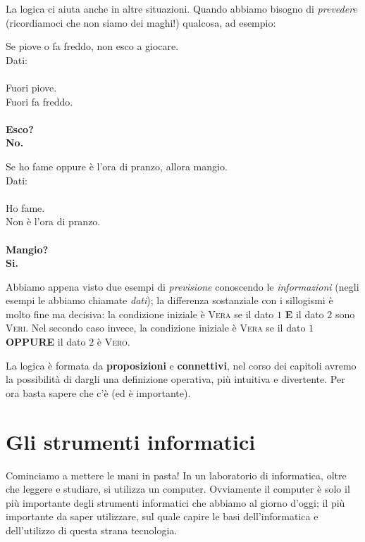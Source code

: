 \documentclass[12pt,fleqn,a4paper]{book} %
\begin{document}
    			La logica ci aiuta anche in altre situazioni. Quando abbiamo bisogno di \textit{prevedere} (ricordiamoci che non siamo dei maghi!) qualcosa, ad esempio:
    			\begin{example}[Previsione]Se piove o fa freddo, non esco a giocare.
    				\\Dati:\\
    				\\Fuori piove.\\Fuori fa freddo.\\
    				\\\textbf{Esco?}
    				\\\textbf{No.}
    			\end{example}
    			\begin{example}[Previsione] Se ho fame oppure è l'ora di pranzo, allora mangio.\\
    				Dati:\\
					\\Ho fame.
					\\Non è l'ora di pranzo.\\
    				\\\textbf{Mangio?}
    				\\\textbf{Si.}
    			\end{example}
    		
    			Abbiamo appena visto due esempi di \textit{previsione} conoscendo le \textit{informazioni} (negli esempi le abbiamo chiamate \textit{dati}); la differenza sostanziale con i sillogismi è molto fine ma decisiva: la condizione iniziale è \textsc{Vera} se il dato $1$ \textbf{E} il dato $2$ sono \textsc{Veri}. Nel secondo caso invece, la condizione iniziale è \textsc{Vera} se il dato $1$ \textbf{OPPURE} il dato $2$ è \textsc{Vero}.
    			
    			La logica è formata da \textbf{proposizioni} e \textbf{connettivi}, nel corso dei capitoli avremo la possibilità di dargli una definizione operativa, più intuitiva e divertente. Per ora basta sapere che c'è (ed è importante).
    		
    		\section{Gli strumenti informatici}
    		\label{sec: Gli strumenti informatici}
    			Cominciamo a mettere le mani in pasta!
    			In un laboratorio di informatica, oltre che leggere e studiare, si utilizza un computer. Ovviamente il computer è solo il più importante degli strumenti informatici che abbiamo al giorno d'oggi; il più importante da saper utilizzare, sul quale capire le basi dell'informatica e dell'utilizzo di questa strana tecnologia.
    			
\end{document}
